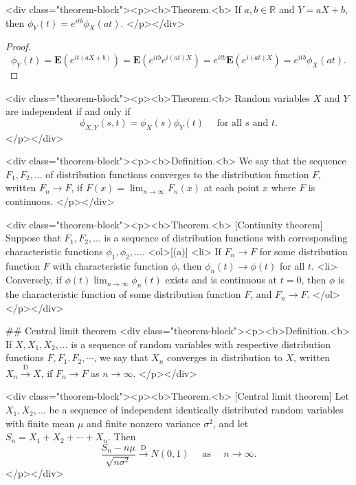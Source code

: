 <div class="theorem-block"><p><b>Theorem.<b> 
If $a, b \in \mathbb{R}$ and $Y = aX+b$, then $\phi_{Y}(t)=e^{i t b} \phi_{X}(a t)$.
</p></div>
\begin{proof}
$$\begin{equation}
    \phi_{Y}(t)=\mathbf{E}\left(e^{i t(a X+b)}\right)=\mathbf{E}\left(e^{i t b} e^{i(a t) X}\right) = e^{i t b} \mathbf{E}\left(e^{i(a t) X}\right)=e^{i t b} \phi_{X}(a t).
\end{equation}$$
\end{proof}

<div class="theorem-block"><p><b>Theorem.<b> 
Random variables $X$ and $Y$ are independent if and only if
$$\begin{equation}
    \phi_{X, Y}(s, t)=\phi_{X}(s) \phi_{Y}(t) \quad \text { for all } s \text { and } t.
\end{equation}$$
</p></div>

<div class="theorem-block"><p><b>Definition.<b> 
We say that the sequence $F_1 , F_2, \dots $ of distribution functions converges to the distribution function $F$, written $F_n \to F$, if $F(x) = \lim_{n\to\infty} F_n(x)$ at each point $x$ where $F$ is continuous.
</p></div>

<div class="theorem-block"><p><b>Theorem.<b> [Continnity theorem]
Suppose that $F_1 , F_2, \dots $ is a sequence of distribution functions 
with corresponding characteristic functions $\phi_1 , \phi_2, \dots $.
<ol>[(a)]
    <li> If $F_n \to F$ for some distribution function $F$ with characteristic function $\phi$, then $\phi_n(t) \to \phi(t)$ for all $t$.
    <li> Conversely, if $\phi(t) \lim_{n\to\infty} \phi_n(t)$ exists and is continuous at $t=0$, then $\phi$ is the characteristic function of some distribution function $F$, and $F_n \to F$.
</ol>
</p></div>


## Central limit theorem
<div class="theorem-block"><p><b>Definition.<b> 
If $X, X_1 , X_2 , \dots$ is a sequence of random variables with respective distribution functions $F, F_1, F_2, \cdots$, we say that $X_n$ converges in distribution to $X$, written $X_{n} \stackrel{\mathrm{D}}{\rightarrow} X$, if $F_n \to F$ as $n \to\infty$.
</p></div>

<div class="theorem-block"><p><b>Theorem.<b> [Central limit theorem]
Let $X_1 , X_2, \dots$ be a sequence of independent identically distributed random variables with finite mean $\mu$ and finite nonzero variance $\sigma^2$, and let $S_n = X_1 + X_2 + \cdots + X_n$. Then
$$\begin{equation}
    \frac{S_{n}-n \mu}{\sqrt{n \sigma^{2}}} \stackrel{\mathrm{D}}{\rightarrow} N(0,1) \quad \text { as } \quad n \rightarrow \infty.
\end{equation}$$
</p></div>


